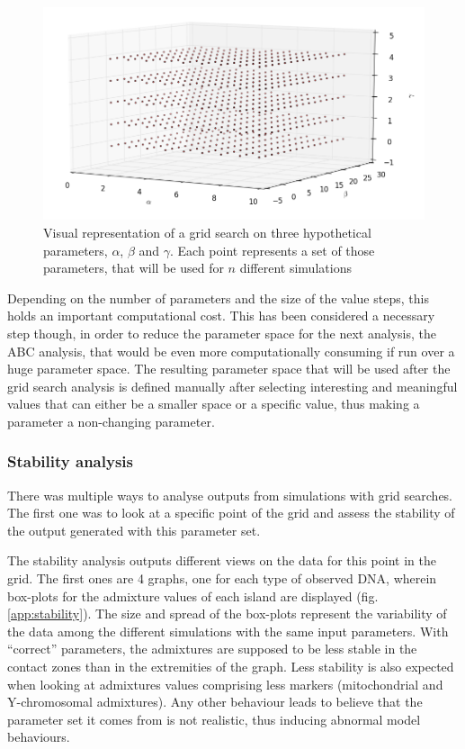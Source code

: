 \documentclass[a4paper,12pt]{report}
\begin{document}
\begin{figure}[!htbp]
	\centering
	\includegraphics[scale=0.65]{../data/grid.png}
	\caption{Visual representation of a grid search on three hypothetical parameters, $\alpha$, $\beta$ and $\gamma$. Each point represents a set of those parameters, that will be used for $n$ different simulations}
	\label{grid}
\end{figure}

Depending on the number of parameters and the size of the value steps, this holds an important computational cost. This has been considered a necessary step though, in order to reduce the parameter space for the next analysis, the ABC analysis, that would be even more computationally consuming if run over a huge parameter space. The resulting parameter space that will be used after the grid search analysis is defined manually after selecting interesting and meaningful values that can either be a smaller space or a specific value, thus making a parameter a non-changing parameter.

\subsubsection{Stability analysis}
There was multiple ways to analyse outputs from simulations with grid searches. The first one was to look at a specific point of the grid and assess the stability of the output generated with this parameter set.

The stability analysis outputs different views on the data for this point in the grid. The first ones are 4 graphs, one for each type of observed DNA, wherein box-plots for the admixture values of each island are displayed (fig. \ref{app:stability}). The size and spread of the box-plots represent the variability of the data among the different simulations with the same input parameters. With “correct” parameters, the admixtures are supposed to be less stable in the contact zones than in the extremities of the graph. Less stability is also expected when looking at admixtures values comprising less markers (mitochondrial and Y-chromosomal admixtures). Any other behaviour leads to believe that the parameter set it comes from is not realistic, thus inducing abnormal model behaviours.
\end{document}
